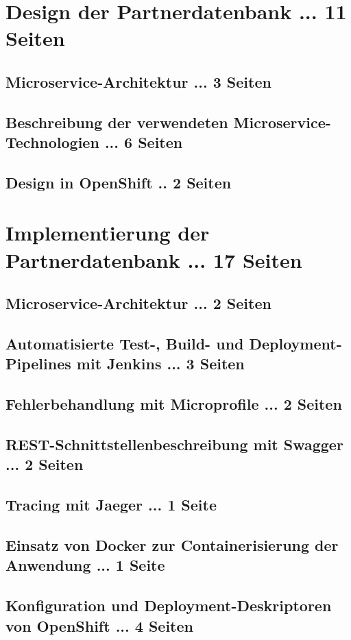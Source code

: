 \documentclass[master,german]{hgbthesis}
\begin{document}
\chapter{Design der Partnerdatenbank ... 11 Seiten}
\section{Microservice-Architektur ... 3 Seiten}
\section{Beschreibung der verwendeten Microservice-Technologien ... 6 Seiten}
\section{Design in OpenShift .. 2 Seiten}


\chapter{Implementierung der Partnerdatenbank ... 17 Seiten}
\section{Microservice-Architektur ... 2 Seiten}
\section{Automatisierte Test-, Build- und Deployment-Pipelines mit Jenkins ... 3 Seiten}
\section{Fehlerbehandlung mit Microprofile ... 2 Seiten}
\section{REST-Schnittstellenbeschreibung mit Swagger ... 2 Seiten}
\section{Tracing mit Jaeger ... 1 Seite}
\section{Einsatz von Docker zur Containerisierung der Anwendung ... 1 Seite}
\section{Konfiguration und Deployment-Deskriptoren von OpenShift ... 4 Seiten}
\end{document}
